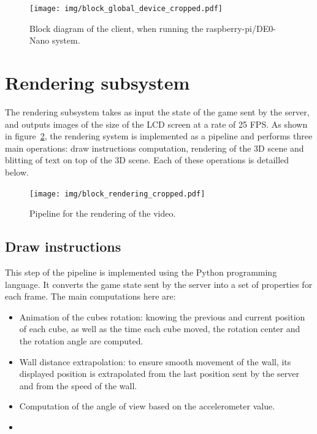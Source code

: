 \documentclass[english, DIV=13]{scrreprt}
\begin{document}
\begin{figure}[bth]
    \centering
    \texttt{[image: img/block\_global\_device\_cropped.pdf]}
    \caption{Block diagram of the client, when running the raspberry-pi/DE0-Nano system.}
    \label{fig:global-device}
\end{figure}

\section{Rendering subsystem}
\label{sec:rendering}

The rendering subsystem takes as input the state of the game sent by the server,
and outputs images of the size of the LCD screen at a rate
of 25 FPS. As shown in figure~\ref{fig:rendering}, the rendering system is
implemented as a pipeline and performs three main operations: draw instructions
computation, rendering of the 3D scene and blitting of text on top of the 3D scene.
Each of these operations is detailled below.

\begin{figure}[bth]
    \centering
    \texttt{[image: img/block\_rendering\_cropped.pdf]}
    \caption{Pipeline for the rendering of the video.}
    \label{fig:rendering}
\end{figure}

\subsection{Draw instructions}

This step of the pipeline is implemented using the Python programming language.
It converts the game state sent by the server into a set of properties for each
frame. The main computations here are:
\begin{itemize}
    \item Animation of the cubes rotation: knowing the previous and current
    position of each cube, as well as the time each cube moved, the rotation
    center and the rotation angle are computed.
    \item Wall distance extrapolation: to ensure smooth movement of the wall, its
    displayed position is extrapolated from the last position sent by the server
    and from the speed of the wall.
    \item Computation of the angle of view based on the accelerometer value.
    \item {}
\end{itemize}
\end{document}
